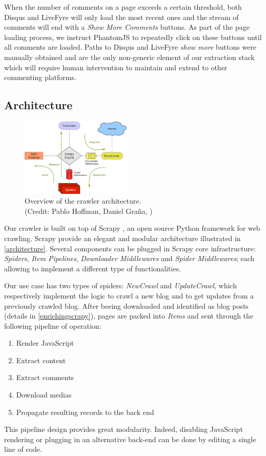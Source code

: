When the number of comments on a page exceeds a certain threshold, both Disqus and LiveFyre will only load the most recent ones and the stream of comments will end with a \emph{Show More Comments} buttons. As part of the page loading process, we instruct PhantomJS to repeatedly click on these buttons until all comments are loaded. Paths to Disqus and LiveFyre \emph{show more} buttons were manually obtained and are the only non-generic element of our extraction stack which will require human intervention to maintain and extend to other commenting platforms.


\subsection{Architecture}

\begin{figure}
  \capstart
  \centering
  \includegraphics[width=0.47\textwidth]{img/scrapy_architecture.png}
  \caption{Overview of the crawler architecture.\\(Credit: Pablo Hoffman, Daniel Graña, \cite{scrapy2013})}
  \label{architecture}
\end{figure}

Our crawler is built on top of Scrapy \cite{scrapy2013}, an open source Python framework for web crawling. Scrapy provide an elegant and modular architecture illustrated in \autoref{architecture}. Several components can be plugged in Scrapy core infrastructure: \emph{Spiders}, \emph{Item Pipelines}, \emph{Downloader Middlewares} and \emph{Spider Middlewares}; each allowing to implement a different type of functionalities.

Our use case has two types of spiders: \emph{NewCrawl} and \emph{UpdateCrawl}, which respectively implement the logic to crawl a new blog and to get updates from a previously crawled blog. After beeing downloaded and identified as blog posts (details in \ref{enrichingscrapy}), pages are packed into \emph{Items} and sent through the following pipeline of operation:
\begin{enumerate}[noitemsep]
  \item Render JavaScript
  \item Extract content
  \item Extract comments
  \item Download medias
  \item Propagate resulting records to the back end
\end{enumerate}
This pipeline design provides great modularity. Indeed, disabling JavaScript rendering or plugging in an alternative back-end can be done by editing a single line of code.


